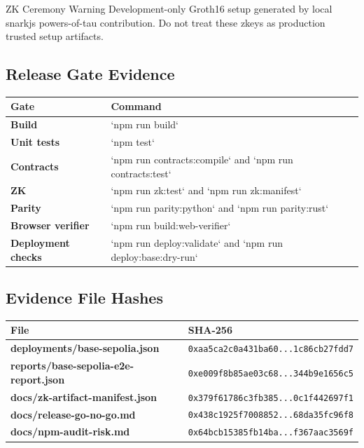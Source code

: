 \documentclass[11pt]{article}
\begin{document}
\begin{warningbox}{ZK Ceremony Warning}
Development-only Groth16 setup generated by local snarkjs powers-of-tau contribution. Do not treat these zkeys as production trusted setup artifacts.
\end{warningbox}

\subsection{Release Gate Evidence}

\begin{center}
\begin{tabularx}{\textwidth}{>{\bfseries}p{} X}
\toprule
Gate & Command \\
\midrule
Build & `npm run build` \\
Unit tests & `npm test` \\
Contracts & `npm run contracts:compile` and `npm run contracts:test` \\
ZK & `npm run zk:test` and `npm run zk:manifest` \\
Parity & `npm run parity:python` and `npm run parity:rust` \\
Browser verifier & `npm run build:web-verifier` \\
Deployment checks & `npm run deploy:validate` and `npm run deploy:base:dry-run` \\
\bottomrule
\end{tabularx}
\end{center}

\subsection{Evidence File Hashes}

\begin{center}
\begin{tabularx}{\textwidth}{>{\bfseries}p{} X}
\toprule
File & SHA-256 \\
\midrule
deployments/base-sepolia.json & \scriptsize\texttt{0xaa5ca2c0a431ba60...1c86cb27fdd7} \\
reports/base-sepolia-e2e-report.json & \scriptsize\texttt{0xe009f8b85ae03c68...344b9e1656c5} \\
docs/zk-artifact-manifest.json & \scriptsize\texttt{0x379f61786c3fb385...0c1f442697f1} \\
docs/release-go-no-go.md & \scriptsize\texttt{0x438c1925f7008852...68da35fc96f8} \\
docs/npm-audit-risk.md & \scriptsize\texttt{0x64bcb15385fb14ba...f367aac3569f} \\
\bottomrule
\end{tabularx}
\end{center}
\end{document}
